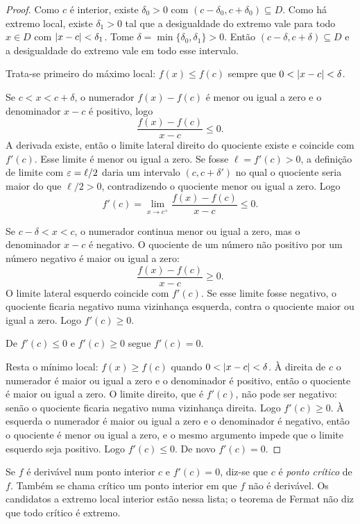 \documentclass[11pt,a4paper]{article}
\begin{document}
\begin{proof}
Como $c$ é interior, existe $\delta_0>0$ com $(c-\delta_0,c+\delta_0)\subseteq D$. Como há extremo local, existe $\delta_1>0$ tal que a desigualdade do extremo vale para todo $x\in D$ com $\left\lvert x-c \right\rvert<\delta_1$. Tome $\delta=\min\{\delta_0,\delta_1\}>0$. Então $(c-\delta,c+\delta)\subseteq D$ e a desigualdade do extremo vale em todo esse intervalo.

Trata-se primeiro do máximo local: $f(x)\le f(c)$ sempre que $0<\left\lvert x-c \right\rvert<\delta$.

Se $c<x<c+\delta$, o numerador $f(x)-f(c)$ é menor ou igual a zero e o denominador $x-c$ é positivo, logo
\[
\frac{f(x)-f(c)}{x-c}\le 0.
\]
A derivada existe, então o limite lateral direito do quociente existe e coincide com $f'(c)$. Esse limite é menor ou igual a zero. Se fosse $\ell=f'(c)>0$, a definição de limite com $\varepsilon=\ell/2$ daria um intervalo $(c,c+\delta')$ no qual o quociente seria maior do que $\ell/2>0$, contradizendo o quociente menor ou igual a zero. Logo
\[
f'(c)=\lim_{x\to c^+}\frac{f(x)-f(c)}{x-c}\le 0.
\]

Se $c-\delta<x<c$, o numerador continua menor ou igual a zero, mas o denominador $x-c$ é negativo. O quociente de um número não positivo por um número negativo é maior ou igual a zero:
\[
\frac{f(x)-f(c)}{x-c}\ge 0.
\]
O limite lateral esquerdo coincide com $f'(c)$. Se esse limite fosse negativo, o quociente ficaria negativo numa vizinhança esquerda, contra o quociente maior ou igual a zero. Logo $f'(c)\ge 0$.

De $f'(c)\le 0$ e $f'(c)\ge 0$ segue $f'(c)=0$.

Resta o mínimo local: $f(x)\ge f(c)$ quando $0<\left\lvert x-c \right\rvert<\delta$. À direita de $c$ o numerador é maior ou igual a zero e o denominador é positivo, então o quociente é maior ou igual a zero. O limite direito, que é $f'(c)$, não pode ser negativo: senão o quociente ficaria negativo numa vizinhança direita. Logo $f'(c)\ge 0$. À esquerda o numerador é maior ou igual a zero e o denominador é negativo, então o quociente é menor ou igual a zero, e o mesmo argumento impede que o limite esquerdo seja positivo. Logo $f'(c)\le 0$. De novo $f'(c)=0$.
\end{proof}

\begin{definicao}
Se $f$ é derivável num ponto interior $c$ e $f'(c)=0$, diz-se que $c$ é \emph{ponto crítico} de $f$. Também se chama crítico um ponto interior em que $f$ não é derivável. Os candidatos a extremo local interior estão nessa lista; o teorema de Fermat não diz que todo crítico é extremo.
\end{definicao}
\end{document}
